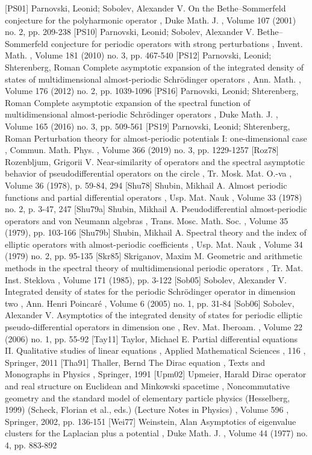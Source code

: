 [PS01] Parnovski, Leonid; Sobolev, Alexander V. On the Bethe–Sommerfeld conjecture for the polyharmonic operator , Duke Math. J. , Volume 107 (2001) no. 2, pp. 209-238
 [PS10] Parnovski, Leonid; Sobolev, Alexander V. Bethe–Sommerfeld conjecture for periodic operators with strong perturbations , Invent. Math. , Volume 181 (2010) no. 3, pp. 467-540
 [PS12] Parnovski, Leonid; Shterenberg, Roman Complete asymptotic expansion of the integrated density of states of multidimensional almost-periodic Schrödinger operators , Ann. Math. , Volume 176 (2012) no. 2, pp. 1039-1096
 [PS16] Parnovski, Leonid; Shterenberg, Roman Complete asymptotic expansion of the spectral function of multidimensional almost-periodic Schrödinger operators , Duke Math. J. , Volume 165 (2016) no. 3, pp. 509-561
 [PS19] Parnovski, Leonid; Shterenberg, Roman Perturbation theory for almost-periodic potentials I: one-dimensional case , Commun. Math. Phys. , Volume 366 (2019) no. 3, pp. 1229-1257
 [Roz78] Rozenbljum, Grigorii V. Near-similarity of operators and the spectral asymptotic behavior of pseudodifferential operators on the circle , Tr. Mosk. Mat. O.-va , Volume 36 (1978), p. 59-84, 294
 [Shu78] Shubin, Mikhail A. Almost periodic functions and partial differential operators , Usp. Mat. Nauk , Volume 33 (1978) no. 2, p. 3-47, 247
 [Shu79a] Shubin, Mikhail A. Pseudodifferential almost-periodic operators and von Neumann algebras , Trans. Mosc. Math. Soc. , Volume 35 (1979), pp. 103-166
 [Shu79b] Shubin, Mikhail A. Spectral theory and the index of elliptic operators with almost-periodic coefficients , Usp. Mat. Nauk , Volume 34 (1979) no. 2, pp. 95-135
 [Skr85] Skriganov, Maxim M. Geometric and arithmetic methods in the spectral theory of multidimensional periodic operators , Tr. Mat. Inst. Steklova , Volume 171 (1985), pp. 3-122
 [Sob05] Sobolev, Alexander V. Integrated density of states for the periodic Schrödinger operator in dimension two , Ann. Henri Poincaré , Volume 6 (2005) no. 1, pp. 31-84
 [Sob06] Sobolev, Alexander V. Asymptotics of the integrated density of states for periodic elliptic pseudo-differential operators in dimension one , Rev. Mat. Iberoam. , Volume 22 (2006) no. 1, pp. 55-92
 [Tay11] Taylor, Michael E. Partial differential equations II. Qualitative studies of linear equations , Applied Mathematical Sciences , 116 , Springer, 2011
 [Tha91] Thaller, Bernd The Dirac equation , Texts and Monographs in Physics , Springer, 1991
 [Upm02] Upmeier, Harald Dirac operator and real structure on Euclidean and Minkowski spacetime , Noncommutative geometry and the standard model of elementary particle physics (Hesselberg, 1999) (Scheck, Florian et al., eds.) (Lecture Notes in Physics) , Volume 596 , Springer, 2002, pp. 136-151
 [Wei77] Weinstein, Alan Asymptotics of eigenvalue clusters for the Laplacian plus a potential , Duke Math. J. , Volume 44 (1977) no. 4, pp. 883-892
